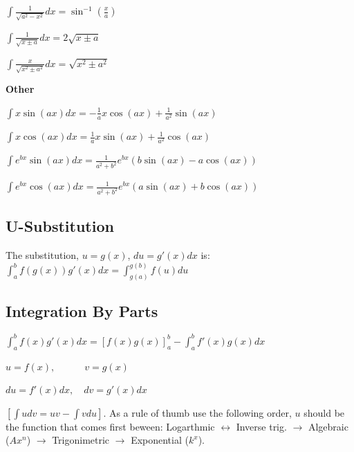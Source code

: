 \documentclass[8pt,a4paper]{extarticle}     %
\theoremstyle{definition}
\theoremstyle{definition}
\theoremstyle{definition}
\begin{document}
\begin{multicols}{4}
\begin{bulletlist}
	\item $\int \frac{1}{\sqrt{a^2-x^2}}dx = \sin^{-1}\left(\frac{x}{a}\right)$
	\item $\int \frac{1}{\sqrt{x\pm a}}dx = 2\sqrt{x\pm a}$
	\item $\int \frac{x}{\sqrt{x^2 \pm a^2}}dx = \sqrt{x^2 \pm a^2}$
	\item [] \textbf{Other}
	\item $\int x\sin(ax)dx = -\frac{1}{a}x\cos(ax)+\frac{1}{a^2}\sin(ax)$
	\item $\int x\cos(ax)dx = \frac{1}{a}x\sin(ax)+\frac{1}{a^2}\cos(ax) $
	\item $\int e^{bx} \sin(ax)dx = \frac{1}{a^2+b^2}e^{bx}\left(b\sin(ax)-a\cos(ax)\right)$
	\item $\int e^{bx} \cos(ax)dx = \frac{1}{a^2+b^2}e^{bx}\left(a\sin(ax)+b\cos(ax)\right)$
\end{bulletlist}

\vfill\null
\columnbreak

\subsection{U-Substitution}
The substitution, $u=g(x)$, $du=g'(x)dx$ is: \\
$\displaystyle\int_a^b f(g(x))g'(x)dx = \int_{g(a)}^{g(b)}f(u)du $
\subsection{Integration By Parts}
$\displaystyle\int_a^b f(x)g'(x)dx = \left[f(x)g(x)\right]_{a}^{b} - \int_a^b f'(x)g(x)dx$ 
\begin{bulletlist}
	\item $u=f(x), \qquad\quad v=g(x)$ 
	\item $du=f'(x)dx, \quad dv=g'(x)dx$
\end{bulletlist}
$[\int u dv = uv-\int v du]$. As a rule of thumb use the following order, $u$ should be the function that comes first beween: Logarthmic $\leftrightarrow$ Inverse trig. $\rightarrow$ Algebraic ($Ax^n$)  $\rightarrow$ Trigonimetric $\rightarrow$ Exponential ($k^x$).

\end{multicols}
\end{document}
